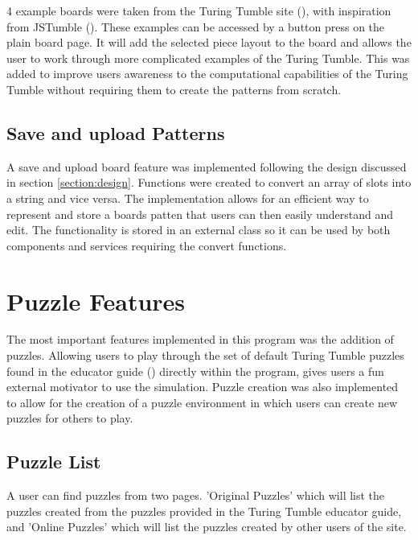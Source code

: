 \documentclass{l4proj}
\begin{document}
4 example boards were taken from the Turing Tumble site (\cite{turing_tumble_site}), with inspiration from JSTumble (\cite{jstumble}). These examples can be accessed by a button press on the plain board page. It will add the selected piece layout to the board and allows the user to work through more complicated examples of the Turing Tumble. This was added to improve users awareness to the computational capabilities of the Turing Tumble without requiring them to create the patterns from scratch. 

\subsection{Save and upload Patterns}
A save and upload board feature was implemented following the design discussed in section \ref{section:design}. Functions were created to convert an array of slots into a string and vice versa. The implementation allows for an efficient way to represent and store a boards patten that users can then easily understand and edit. The functionality is stored in an external class so it can be used by both components and services requiring the convert functions.

\section{Puzzle Features}
The most important features implemented in this program was the addition of puzzles. Allowing users to play through the set of default Turing Tumble puzzles found in the educator guide (\cite{educator_resources}) directly within the program, gives users a fun external motivator to use the simulation. Puzzle creation was also implemented to allow for the creation of a puzzle environment in which users can create new puzzles for others to play.

\subsection{Puzzle List}
A user can find puzzles from two pages. 'Original Puzzles' which will list the puzzles created from the puzzles provided in the Turing Tumble educator guide, and 'Online Puzzles' which will list the puzzles created by other users of the site.
\end{document}
